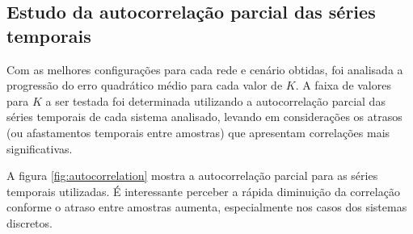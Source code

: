 \documentclass[a4paper, 12pt]{article}
\begin{document}
\subsection{Estudo da autocorrelação parcial das séries temporais}

Com as melhores configurações para cada rede e cenário obtidas, foi analisada a progressão do erro quadrático médio para cada valor de $K$. A faixa de valores para $K$ a ser testada foi determinada utilizando a autocorrelação parcial das séries temporais de cada sistema analisado, levando em considerações os atrasos (ou afastamentos temporais entre amostras) que apresentam correlações mais significativas. 

A figura \ref{fig:autocorrelation} mostra a autocorrelação parcial para as séries temporais utilizadas. É interessante perceber a rápida diminuição da correlação conforme o atraso entre amostras aumenta, especialmente nos casos dos sistemas discretos. 
\end{document}
